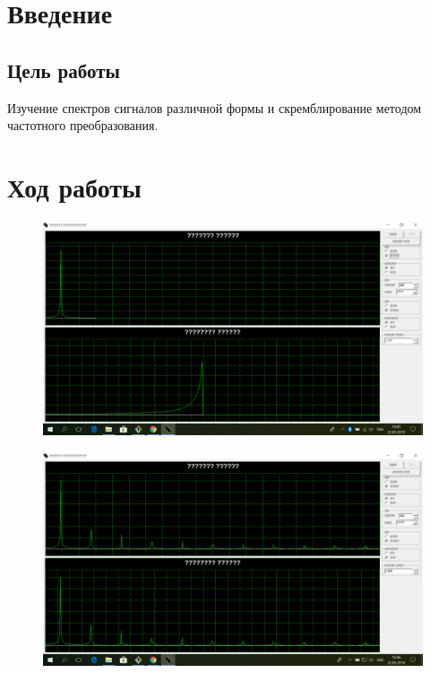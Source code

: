\chapter{Введение}

\section{Цель работы}

Изучение спектров сигналов различной формы и скремблирование методом частотного преобразования.

\chapter{Ход работы}



\begin{figure}[H]
	\centering
	\includegraphics[width=\textwidth]{img/1.png}
	\caption{}
\end{figure}

\begin{figure}[H]
	\centering
	\includegraphics[width=\textwidth]{img/2.png}
	\caption{}
\end{figure}

